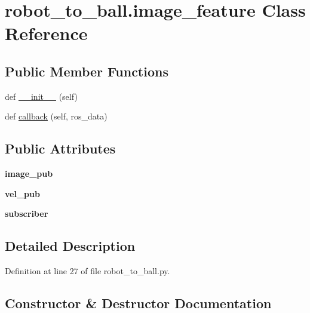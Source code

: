 \hypertarget{classrobot__to__ball_1_1image__feature}{}\section{robot\+\_\+to\+\_\+ball.\+image\+\_\+feature Class Reference}
\label{classrobot__to__ball_1_1image__feature}
\subsection*{Public Member Functions}
\begin{DoxyCompactItemize}
\item 
def \hyperlink{classrobot__to__ball_1_1image__feature_a11786e63291f4aba9857349a272e8be7}{\+\_\+\+\_\+init\+\_\+\+\_\+} (self)
\item 
def \hyperlink{classrobot__to__ball_1_1image__feature_a1193dd210c472ae7ec719b513a41daaf}{callback} (self, ros\+\_\+data)
\end{DoxyCompactItemize}
\subsection*{Public Attributes}
\begin{DoxyCompactItemize}
\item 
\mbox{\label{classrobot__to__ball_1_1image__feature_ac8ab0d47c79ed16879966180d1ed0d70}} 
{\bfseries image\+\_\+pub}
\item 
\mbox{\label{classrobot__to__ball_1_1image__feature_a32543d2f34b5e4f114a6eb63f6d71b3a}} 
{\bfseries vel\+\_\+pub}
\item 
\mbox{\label{classrobot__to__ball_1_1image__feature_aaa6b6d2e86042b5b52c2ffefe4533a6f}} 
{\bfseries subscriber}
\end{DoxyCompactItemize}


\subsection{Detailed Description}


Definition at line 27 of file robot\+\_\+to\+\_\+ball.\+py.



\subsection{Constructor \& Destructor Documentation}
\mbox{\label{classrobot__to__ball_1_1image__feature_a11786e63291f4aba9857349a272e8be7}} 
